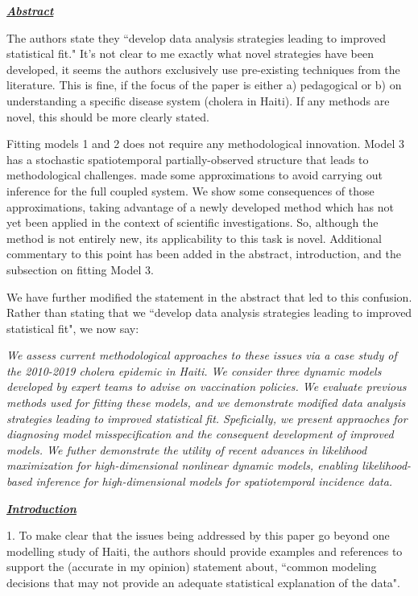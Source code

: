 \documentclass[11pt]{article}
\newcommand\report[1]{{\color{mygreen} \vspace{1mm}\hspace{0.25in}\parbox{6in}{\em #1}}}
\newcommand\article[1]{{\color{blue} \vspace{1mm}\hspace{0.25in}\parbox{6in}{\em #1}}}
\begin{document}
\report{
  \textbf{\underline{Abstract}}

  The authors state they ``develop data analysis strategies leading to improved statistical fit." It's not clear to me exactly what novel strategies have been developed, it seems the authors exclusively use pre-existing techniques from the literature. This is fine, if the focus of the paper is either a) pedagogical or b) on understanding a specific disease system (cholera in Haiti). If any methods are novel, this should be more clearly stated.
}

Fitting models 1 and 2 does not require any methodological innovation. Model 3 has a stochastic spatiotemporal partially-observed structure that leads to methodological challenges. \cite{lee20} made some approximations to avoid carrying out inference for the full coupled system. We show some consequences of those approximations, taking advantage of a newly developed method which has not yet been applied in the context of scientific investigations. So, although the method is not entirely new, its applicability to this task is novel.
Additional commentary to this point has been added in the abstract, introduction, and the subsection on fitting Model 3.

We have further modified the statement in the abstract that led to this confusion. Rather than stating that we ``develop data analysis strategies leading to improved statistical fit", we now say:

\article{We assess current methodological approaches to these issues via a case study of the 2010-2019 cholera epidemic in Haiti. We consider three dynamic models developed by expert teams to advise on vaccination policies. We evaluate previous methods used for fitting these models, and we demonstrate modified data analysis strategies leading to improved statistical fit. Speficially, we present appraoches for diagnosing model misspecification and the consequent development of improved models. We futher demonstrate the utility of recent advances in likelihood maximization for high-dimensional nonlinear dynamic models, enabling likelihood-based inference for high-dimensional models for spatiotemporal incidence data.}

\report{
  \textbf{\underline{Introduction}}

1.  To make clear that the issues being addressed by this paper go beyond one modelling study of Haiti, the authors should provide examples and references to support the (accurate in my opinion) statement about, ``common modeling decisions that may not provide an adequate statistical explanation of the data".
}
\end{document}
